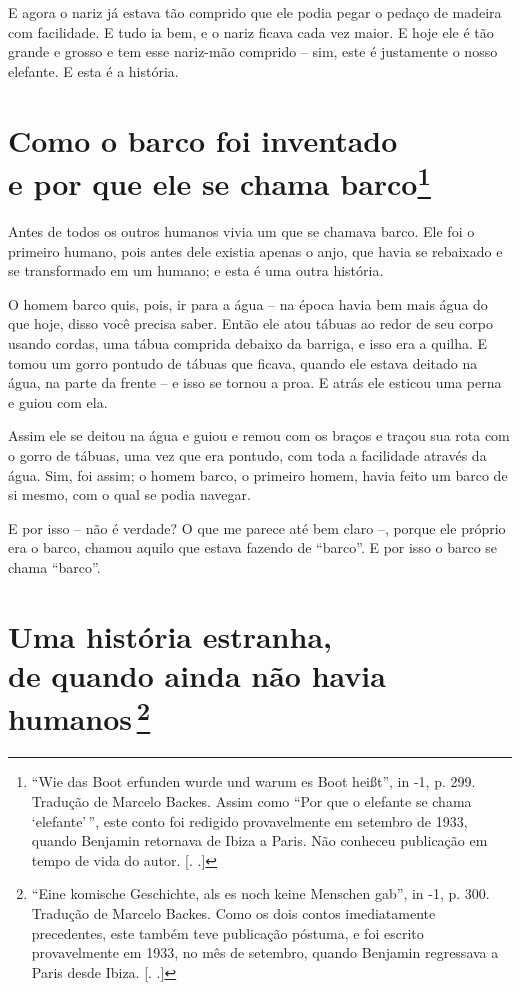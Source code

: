 E agora o nariz já estava tão comprido que ele podia pegar o pedaço de
madeira com facilidade. E tudo ia bem, e o nariz ficava cada vez maior.
E hoje ele é tão grande e grosso e tem esse nariz-mão comprido -- sim,
este é justamente o nosso elefante. E esta é a história.

\chapter{Como o barco foi inventado \\e por que ele se chama barco\footnote[*]{``Wie
  das Boot erfunden wurde und warum es Boot heißt'', in  -1, p.
  299. Tradução de Marcelo Backes. Assim como ``Por que o elefante se
      chama `elefante'\,'', este conto foi redigido provavelmente em setembro
  de 1933, quando Benjamin retornava de Ibiza a Paris. Não conheceu
  publicação em tempo de vida do autor. [. .]} }

Antes de todos os outros humanos vivia um que se chamava barco. Ele foi
o primeiro humano, pois antes dele existia apenas o anjo, que havia se
rebaixado e se transformado em um humano; e esta é uma outra história.

O homem barco quis, pois, ir para a água -- na época havia bem mais água
do que hoje, disso você precisa saber. Então ele atou tábuas ao redor de
seu corpo usando cordas, uma tábua comprida debaixo da barriga, e isso
era a quilha. E tomou um gorro pontudo de tábuas que ficava, quando ele
estava deitado na água, na parte da frente -- e isso se tornou a proa. E
atrás ele esticou uma perna e guiou com ela.

Assim ele se deitou na água e guiou e remou com os braços e traçou sua
rota com o gorro de tábuas, uma vez que era pontudo, com toda a
facilidade através da água. Sim, foi assim; o homem barco, o primeiro
homem, havia feito um barco de si mesmo, com o qual se podia navegar.

E por isso -- não é verdade? O que me parece até bem claro --, porque
ele próprio era o barco, chamou aquilo que estava fazendo de ``barco''.
E por isso o barco se chama ``barco''.

\chapter{Uma história estranha, \\de quando ainda não havia humanos\,\footnote[*]{``Eine komische Geschichte, als es noch keine
  Menschen gab'', in  -1, p. 300. Tradução de Marcelo Backes. Como
  os dois contos imediatamente precedentes, este também teve publicação
  póstuma, e foi escrito provavelmente em 1933, no mês de setembro,
  quando Benjamin regressava a Paris desde Ibiza. [. .]} }

